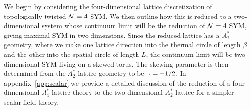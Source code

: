 We begin by considering the four-dimensional lattice discretization of topologically twisted $\mathcal N = 4$ SYM.
We then outline how this is reduced to a two-dimensional system whose continuum limit will be the reduction of $\mathcal N = 4$ SYM, giving maximal SYM in two dimensions.
Since the reduced lattice has a $A_2^*$ geometry, where we make one lattice direction into the thermal circle of length $\beta$ and the other into the spatial circle of length $L$, the continuum limit will be two-dimensional SYM living on a skewed torus.
The skewing parameter is then determined from the $A_2^*$ lattice geometry to be $\gamma = -1 / 2$.
In appendix~\ref{app:scalar} we provide a detailed discussion of the reduction of a four-dimensional $A_4^*$ lattice theory to the two-dimensional $A_2^*$ lattice for a simpler scalar field theory.

